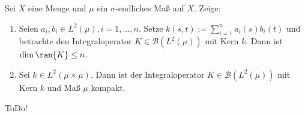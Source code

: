 \begin{exercise}[IO/2]

Sei $X$ eine Menge und $\mu$ ein $\sigma$-endliches Maß auf $X$.
Zeige:

\begin{enumerate}[label = (\alph*)]

  \item
  Seien $a_i, b_i \in L^2(\mu), i = 1, \ldots, n$.
  Setze $k(s, t) := \sum_{i=1}^n a_i(s) b_i(t)$ und betrachte den Integraloperator $K \in \mathcal{B}(L^2(\mu))$ mit Kern $k$.
  Dann ist $\dim{\ran{K}} \leq n$.

  \item
  Sei $k \in L^2(\mu \times \mu)$.
  Dann ist der Integraloperator $K \in \mathcal{B}(L^2(\mu))$ mit Kern $k$ und Maß $\mu$ kompakt.

\end{enumerate}

\end{exercise}

\begin{solution}

ToDo!

\end{solution}
